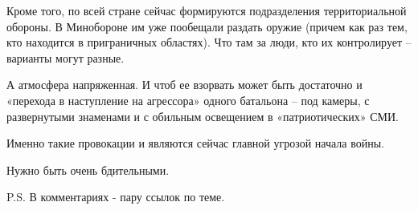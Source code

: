 Кроме того, по всей стране сейчас формируются подразделения территориальной
обороны. В Минобороне им уже пообещали раздать оружие (причем как раз тем, кто
находится в приграничных областях). Что там за люди, кто их контролирует –
варианты могут разные. 

А атмосфера напряженная. И чтоб ее взорвать может быть достаточно и «перехода в
наступление на агрессора» одного батальона – под камеры, с развернутыми
знаменами и с обильным освещением в «патриотических» СМИ.

Именно такие провокации и являются сейчас главной угрозой начала войны.

Нужно быть очень бдительными.

P.S. В комментариях - пару ссылок по теме.

